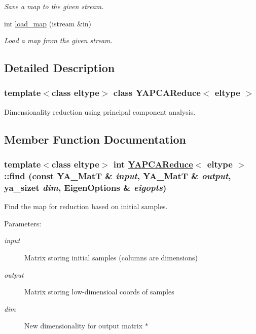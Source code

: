 \begin{CompactItemize}
\begin{CompactList}\small\item\em Save a map to the given stream. \item\end{CompactList}\item 
\hypertarget{class_y_a_p_c_a_reduce_a13}{
int \hyperlink{class_y_a_p_c_a_reduce_a13}{load\_\-map} (istream \&in)}
\label{class_y_a_p_c_a_reduce_a13}

\begin{CompactList}\small\item\em Load a map from the given stream. \item\end{CompactList}\end{CompactItemize}


\subsection{Detailed Description}
\subsubsection*{template$<$class eltype$>$ class YAPCAReduce$<$ eltype $>$}

Dimensionality reduction using principal component analysis. 



\subsection{Member Function Documentation}
\hypertarget{class_y_a_p_c_a_reduce_a8}{
\subsubsection[find]{\setlength{\rightskip}{0pt plus 5cm}template$<$class eltype$>$ int \hyperlink{class_y_a_p_c_a_reduce}{YAPCAReduce}$<$ eltype $>$::find (const YA\_\-Mat\-T \& {\em input}, YA\_\-Mat\-T \& {\em output}, ya\_\-sizet {\em dim}, Eigen\-Options \& {\em eigopts})}}
\label{class_y_a_p_c_a_reduce_a8}


Find the map for reduction based on initial samples. 

\begin{Desc}
\item[Parameters:]
\begin{description}
\item[{\em input}]Matrix storing initial samples (columns are dimensions) \item[{\em output}]Matrix storing low-dimensioal coords of samples \item[{\em dim}]New dimensionality for output matrix $\ast$ \end{description}
\end{Desc}


